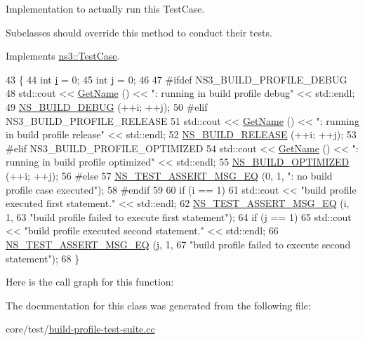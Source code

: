 Implementation to actually run this Test\+Case. 

Subclasses should override this method to conduct their tests. 

Implements \hyperlink{classns3_1_1TestCase_a8ff74680cf017ed42011e4be51917a24}{ns3\+::\+Test\+Case}.


\begin{DoxyCode}
43 \{
44   \textcolor{keywordtype}{int} \hyperlink{bernuolliDistribution_8m_a6f6ccfcf58b31cb6412107d9d5281426}{i} = 0;
45   \textcolor{keywordtype}{int} j = 0;
46 
47 \textcolor{preprocessor}{#ifdef NS3\_BUILD\_PROFILE\_DEBUG}
48   std::cout << \hyperlink{classns3_1_1TestCase_a28f7bb59669c24dae1c290fc17fc9b62}{GetName} () << \textcolor{stringliteral}{": running in build profile debug"} << std::endl;
49   \hyperlink{build-profile_8h_a8f46d39331904495b189a130c099c029}{NS\_BUILD\_DEBUG} (++i; ++j);
50 \textcolor{preprocessor}{#elif NS3\_BUILD\_PROFILE\_RELEASE}
51   std::cout << \hyperlink{classns3_1_1TestCase_a28f7bb59669c24dae1c290fc17fc9b62}{GetName} () << \textcolor{stringliteral}{": running in build profile release"} << std::endl;
52   \hyperlink{build-profile_8h_a5e1343bd6d1905d8222e62a901b96525}{NS\_BUILD\_RELEASE} (++i; ++j);
53 \textcolor{preprocessor}{#elif NS3\_BUILD\_PROFILE\_OPTIMIZED}
54   std::cout << \hyperlink{classns3_1_1TestCase_a28f7bb59669c24dae1c290fc17fc9b62}{GetName} () << \textcolor{stringliteral}{": running in build profile optimized"} << std::endl;
55   \hyperlink{build-profile_8h_a18649505b0d3317cfbb1cdc18c757d96}{NS\_BUILD\_OPTIMIZED} (++i; ++j);
56 \textcolor{preprocessor}{#else}
57   \hyperlink{group__testing_ga2a9d78cffb3db8e867c35fff0b698cf5}{NS\_TEST\_ASSERT\_MSG\_EQ} (0, 1, \textcolor{stringliteral}{": no build profile case executed"});
58 \textcolor{preprocessor}{#endif}
59   
60   \textcolor{keywordflow}{if} (i == 1)
61     std::cout << \textcolor{stringliteral}{"build profile executed first statement."} << std::endl;
62   \hyperlink{group__testing_ga2a9d78cffb3db8e867c35fff0b698cf5}{NS\_TEST\_ASSERT\_MSG\_EQ} (i, 1,
63                          \textcolor{stringliteral}{"build profile failed to execute first statement"});
64   \textcolor{keywordflow}{if} (j == 1)
65     std::cout << \textcolor{stringliteral}{"build profile executed second statement."} << std::endl;
66   \hyperlink{group__testing_ga2a9d78cffb3db8e867c35fff0b698cf5}{NS\_TEST\_ASSERT\_MSG\_EQ} (j, 1,
67                          \textcolor{stringliteral}{"build profile failed to execute second statement"});
68 \}
\end{DoxyCode}


Here is the call graph for this function\+:




The documentation for this class was generated from the following file\+:\begin{DoxyCompactItemize}
\item 
core/test/\hyperlink{build-profile-test-suite_8cc}{build-\/profile-\/test-\/suite.\+cc}\end{DoxyCompactItemize}

